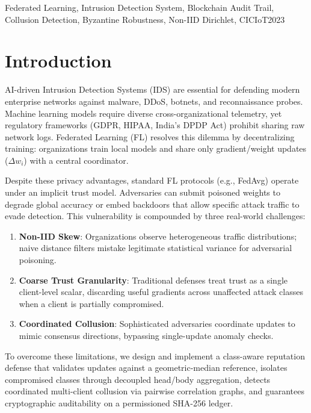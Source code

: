 \documentclass[conference]{IEEEtran}
\begin{document}
\begin{IEEEkeywords}
Federated Learning, Intrusion Detection System, Blockchain Audit Trail, Collusion Detection, Byzantine Robustness, Non-IID Dirichlet, CICIoT2023
\end{IEEEkeywords}

\section{Introduction}
AI-driven Intrusion Detection Systems (IDS) are essential for defending modern enterprise networks against malware, DDoS, botnets, and reconnaissance probes. Machine learning models require diverse cross-organizational telemetry, yet regulatory frameworks (GDPR, HIPAA, India's DPDP Act) prohibit sharing raw network logs. Federated Learning (FL) resolves this dilemma by decentralizing training: organizations train local models and share only gradient/weight updates ($\Delta w_i$) with a central coordinator.

Despite these privacy advantages, standard FL protocols (e.g., FedAvg) operate under an implicit trust model. Adversaries can submit poisoned weights to degrade global accuracy or embed backdoors that allow specific attack traffic to evade detection. This vulnerability is compounded by three real-world challenges:
\begin{enumerate}
    \item \textbf{Non-IID Skew}: Organizations observe heterogeneous traffic distributions; naive distance filters mistake legitimate statistical variance for adversarial poisoning.
    \item \textbf{Coarse Trust Granularity}: Traditional defenses treat trust as a single client-level scalar, discarding useful gradients across unaffected attack classes when a client is partially compromised.
    \item \textbf{Coordinated Collusion}: Sophisticated adversaries coordinate updates to mimic consensus directions, bypassing single-update anomaly checks.
\end{enumerate}

To overcome these limitations, we design and implement a class-aware reputation defense that validates updates against a geometric-median reference, isolates compromised classes through decoupled head/body aggregation, detects coordinated multi-client collusion via pairwise correlation graphs, and guarantees cryptographic auditability on a permissioned SHA-256 ledger.
\end{document}
